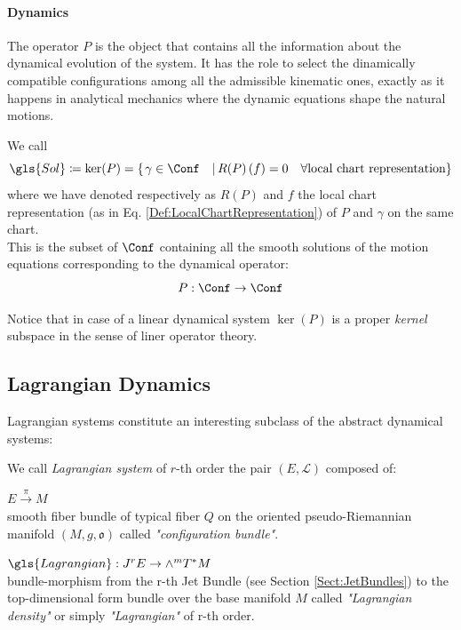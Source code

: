 \documentclass[Main]{subfiles}
\begin{document}
	\paragraph{Dynamics}
	The operator $P$ is the object that contains all the information about the dynamical evolution of the system.
	It has the role to select the dinamically compatible configurations among all the admissible kinematic ones, exactly as it happens in analytical mechanics where the dynamic equations shape the natural motions.
	\begin{definition}\label{Def:SolSpace}
		We call
		\begin{displaymath}
			\gls{Sol} \coloneqq \ker(P) = \left\{\left. \gamma \in \Conf \quad\right\vert  R(P)\left(f\right) = 0 \quad \forall \textrm{local chart representation}\right\}
		\end{displaymath}
		where we have denoted respectively as $R(P)$ and $f$ the local chart representation (as in Eq. \ref{Def:LocalChartRepresentation}) of $P$ and $\gamma$ on the same chart.\\
		This is the subset of $\Conf$ containing all the smooth solutions of the motion equations corresponding to the  dynamical operator:	
		\begin{displaymath}
			P: \Conf \rightarrow \Conf
		\end{displaymath}
	\end{definition}
	Notice that in case of a linear dynamical system $\ker(P)$ is a proper \emph{kernel} subspace in the sense of liner operator theory.
	
	
	\subsection{Lagrangian Dynamics}	
	Lagrangian systems constitute an interesting subclass of the abstract dynamical systems:
		\begin{definition}
			We call \emph{Lagrangian system} of $r$-th order the
			pair $(E, \mathcal{L} )$ composed of:
			\begin{compactitemize}
				\item $E \xrightarrow{\pi} M$ \\smooth fiber bundle of typical fiber $Q$ on the oriented pseudo-Riemannian manifold $(M,g,\mathfrak{o})$ called \emph{"configuration bundle"}.
				\item	$ \gls{Lagrangian} : J^r E \rightarrow \wedge^m T^*M$ \\bundle-morphism from the r-th Jet Bundle (see Section \ref{Sect:JetBundles}) to  the top-dimensional form bundle over the base manifold $M$  called \emph{"Lagrangian density"} or simply \emph{"Lagrangian"} of r-th order.
			\end{compactitemize}
		\end{definition}	
	
\end{document}

